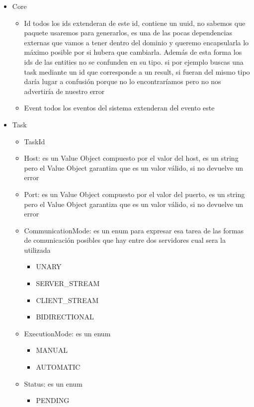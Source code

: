 \begin{itemize}
    \item Core
    \begin{itemize}
        \item Id todos los ids extenderan de este id, contiene un uuid, no sabemos que paquete usaremos para generarlos, es una de las pocas dependencias externas que vamos a tener dentro del dominio y queremo encapsularla lo máximo posible por si hubera que cambiarla. Además de esta forma los ids de las entities no se confunden en su tipo. si por ejemplo buscas una task mediante un id que corresponde a un result, si fueran del mismo tipo daría lugar a confusión porque no lo encontraríamos pero no nos advertiría de nuestro error
        \item Event todos los eventos del sistema extenderan del evento este
    \end{itemize}
    \item Task
    \begin{itemize}
        \item TaskId
        \item Host: es un Value Object compuesto por el valor del host, es un string pero el Value Object garantiza que es un valor válido, si no devuelve un error
        \item Port: es un Value Object compuesto por el valor del puerto, es un string pero el Value Object garantiza que es un valor válido, si no devuelve un error
        \item CommunicationMode: es un enum para expresar esa tarea de las formas de comunicación posibles que hay entre dos servidores cual sera la utilizada
        \begin{itemize}
            \item UNARY
            \item SERVER\_STREAM
            \item CLIENT\_STREAM
            \item BIDIRECTIONAL
        \end{itemize}
        \item ExecutionMode: es un enum
        \begin{itemize}
            \item MANUAL
            \item AUTOMATIC
        \end{itemize}
        \item Status: es un enum
        \begin{itemize}
            \item PENDING

\end{itemize}
\end{itemize}
\end{itemize}
